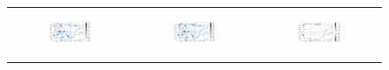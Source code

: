 \begin{figure}[htbp]
\begin{tabular}{ccc}
        \begin{subfigure}[b]{0.33\textwidth}
            \caption{}
            \includegraphics[width=\linewidth]{images/eval_halfdeg/maps/fastr_subgrid.png}
        \end{subfigure} &
        \begin{subfigure}[b]{0.33\textwidth}
            \caption{}
            \includegraphics[width=\linewidth]{images/eval_halfdeg/maps/fastr_interp.png}
        \end{subfigure} &
        \begin{subfigure}[b]{0.33\textwidth}
            \caption{}
            \includegraphics[width=\linewidth]{images/eval_halfdeg/maps/fastr_diff.png}
        \end{subfigure} \\
        

\end{tabular}
\end{figure}
